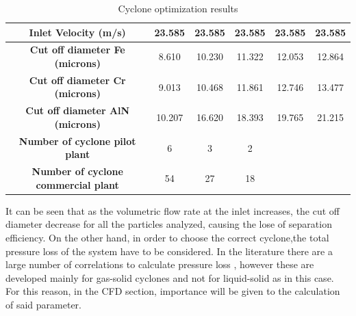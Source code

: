 \begin{table}[H]
\begin{tabular}{cccccc}
		\rule[-0.3cm]{0pt}{0.8cm}\textbf{Inlet Velocity (m/s)}                                        & 23.585     & 23.585      & 23.585       & 23.585      & 23.585     \\\hline
		\rule[-0.3cm]{0pt}{0.8cm}\textbf{Cut off diameter Fe (microns)}                         & 8.610      & 10.230      & 11.322       & 12.053      & 12.864     \\\hline
		\rule[-0.3cm]{0pt}{0.8cm}\textbf{Cut off diameter Cr  (microns)}                        & 9.013      & 10.468      & 11.861       & 12.746      & 13.477     \\\hline
		\rule[-0.3cm]{0pt}{0.8cm}\textbf{Cut off diameter AlN (microns)}                        & 10.207     & 16.620      & 18.393       & 19.765      & 21.215     \\\hline
		\rule[-0.3cm]{0pt}{0.8cm}\textbf{Number of cyclone pilot   plant}                       & 6          & 3           & 2            &             &            \\\hline
		\rule[-0.3cm]{0pt}{0.8cm}\textbf{Number of cyclone commercial plant}                  & 54         & 27          & 18           &             &              \\\hline
	\end{tabular}
	\caption{Cyclone optimization results}
	\label{info_cyclone}
\end{table}


It can be seen that as the volumetric flow rate at the inlet increases, the cut off diameter decrease for all the particles analyzed, causing the lose of separation efficiency. On the other hand, in order to  choose the correct cyclone,the total pressure loss of the system have to be considered. In the literature there are a large number of correlations to calculate pressure loss \cite{Concha2007,Altmeyer2003}, however these are developed mainly for gas-solid cyclones and not for liquid-solid as in this case. For this reason, in the CFD section, importance will be given to the calculation of said parameter.




